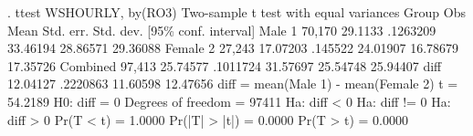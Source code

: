 . ttest WSHOURLY, by(RO3)
{\smallskip}
Two-sample t test with equal variances
   Group {\VBAR}     Obs        Mean    Std. err.   Std. dev.   [95\% conf. interval]
  Male 1 {\VBAR}  70,170     29.1133    .1263209    33.46194    28.86571    29.36088
Female 2 {\VBAR}  27,243    17.07203     .145522    24.01907    16.78679    17.35726
Combined {\VBAR}  97,413    25.74577    .1011724    31.57697    25.54748    25.94407
    diff {\VBAR}            12.04127    .2220863                11.60598    12.47656
    diff = mean(Male 1) - mean(Female 2)                          t =  54.2189
H0: diff = 0                                     Degrees of freedom =    97411
{\smallskip}
    Ha: diff < 0                 Ha: diff != 0                 Ha: diff > 0
 Pr(T < t) = 1.0000         Pr(|T| > |t|) = 0.0000          Pr(T > t) = 0.0000
{\smallskip}
